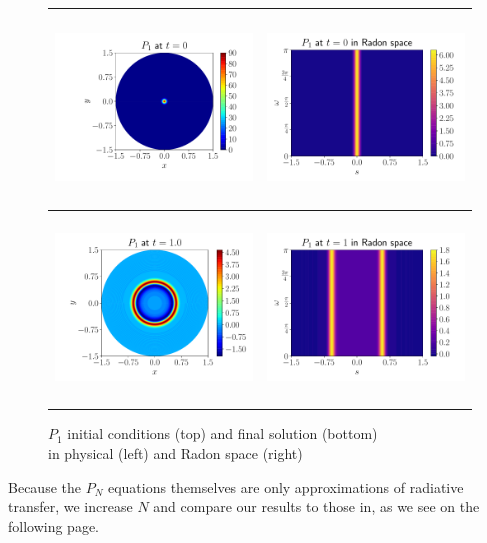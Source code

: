 \begin{center}
\begin{figure}[H]
    \begin{tabular}{c|c}
        \includegraphics[height=5cm]{figures/physical_inital_p1.pdf} & \includegraphics[height=5cm]{figures/radon_inital_p1.pdf} \\ \hline
        \includegraphics[height=5cm]{figures/physical_final_p1.pdf} & \includegraphics[height=5cm]{figures/radon_final_p1.pdf}
    \end{tabular}
    \caption{$P_1$ initial conditions (top) and final solution (bottom) \\ in physical (left) and Radon space (right)}
\end{figure}
\end{center}
\FloatBarrier
Because the $P_N$ equations themselves are only approximations of radiative transfer, we increase $N$ and compare our results to those in\cite{Shin:6}, as we see on the following page.

